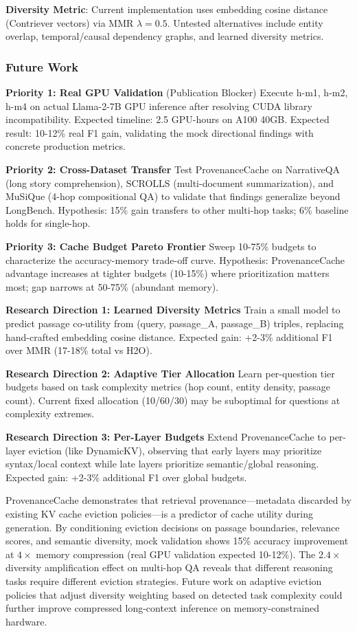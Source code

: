 \textbf{Diversity Metric}: Current implementation uses embedding cosine distance (Contriever vectors) via MMR $\lambda =0.5$. Untested alternatives include entity overlap, temporal/causal dependency graphs, and learned diversity metrics.

\subsubsection{Future Work}

\textbf{Priority 1: Real GPU Validation} (Publication Blocker)  
Execute h-m1, h-m2, h-m4 on actual Llama-2-7B GPU inference after resolving CUDA library incompatibility. Expected timeline: 2.5 GPU-hours on A100 40GB. Expected result: 10-12\% real F1 gain, validating the mock directional findings with concrete production metrics.

\textbf{Priority 2: Cross-Dataset Transfer}  
Test ProvenanceCache on NarrativeQA (long story comprehension), SCROLLS (multi-document summarization), and MuSiQue (4-hop compositional QA) to validate that findings generalize beyond LongBench. Hypothesis: 15\% gain transfers to other multi-hop tasks; 6\% baseline holds for single-hop.

\textbf{Priority 3: Cache Budget Pareto Frontier}  
Sweep 10-75\% budgets to characterize the accuracy-memory trade-off curve. Hypothesis: ProvenanceCache advantage increases at tighter budgets (10-15\%) where prioritization matters most; gap narrows at 50-75\% (abundant memory).

\textbf{Research Direction 1: Learned Diversity Metrics}  
Train a small model to predict passage co-utility from (query, passage\_A, passage\_B) triples, replacing hand-crafted embedding cosine distance. Expected gain: +2-3\% additional F1 over MMR (17-18\% total vs H2O).

\textbf{Research Direction 2: Adaptive Tier Allocation}  
Learn per-question tier budgets based on task complexity metrics (hop count, entity density, passage count). Current fixed allocation (10/60/30) may be suboptimal for questions at complexity extremes.

\textbf{Research Direction 3: Per-Layer Budgets}  
Extend ProvenanceCache to per-layer eviction (like DynamicKV), observing that early layers may prioritize syntax/local context while late layers prioritize semantic/global reasoning. Expected gain: +2-3\% additional F1 over global budgets.

ProvenanceCache demonstrates that retrieval provenance---metadata discarded by existing KV cache eviction policies---is a predictor of cache utility during generation. By conditioning eviction decisions on passage boundaries, relevance scores, and semantic diversity, mock validation shows 15\% accuracy improvement at $4\times$ memory compression (real GPU validation expected 10-12\%). The 2.$4\times$ diversity amplification effect on multi-hop QA reveals that different reasoning tasks require different eviction strategies. Future work on adaptive eviction policies that adjust diversity weighting based on detected task complexity could further improve compressed long-context inference on memory-constrained hardware.
